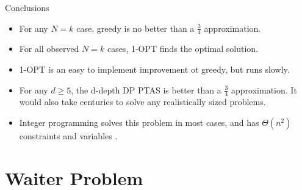\documentclass[compress,table]{beamer}
\begin{document}
\begin{frame}[t]{Conclusions}

\begin{itemize}
\item For any $N=k$ case, greedy is no better than a $\frac34$ approximation.

\item For all observed $N=k$ cases, 1-OPT finds the optimal solution.

\item 1-OPT is an easy to implement improvement ot greedy, but runs slowly.

\item For any $d\geq 5$, the d-depth DP PTAS is better than a $\frac34$ approximation.  It would also take centuries to solve any realistically sized problems.

\item Integer programming solves this problem in most cases, and has $\Theta(n^2)$ constraints and variables .
\end{itemize}

\end{frame}

\section[Waiter]{Waiter Problem}
\end{document}
